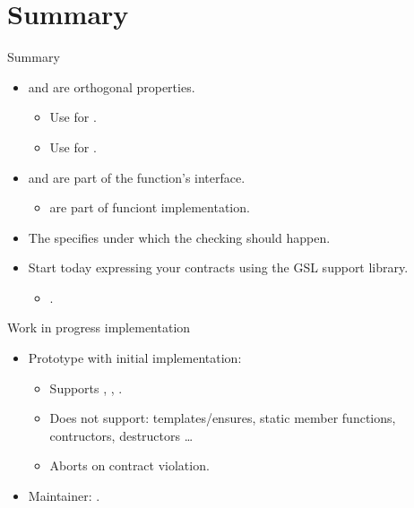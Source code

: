 \section{Summary}

\begin{frame}[t]{Summary}
\begin{itemize}
  \item {} and  are orthogonal properties.
    \begin{itemize}
      \item Use  for .
      \item Use  for .
    \end{itemize}

  \vfill\pause
  \item {} and  are part of the
        function's interface.
    \begin{itemize}
      \item {} are part of funciont implementation.
    \end{itemize}

  \vfill\pause
  \item The  specifies under which 
        the checking should happen.

  \vfill\pause
  \item Start today expressing your contracts using the GSL support library.
    \begin{itemize}
      \item {}.
    \end{itemize}
\end{itemize}
\end{frame}

\begin{frame}[t]{Work in progress implementation}
\begin{itemize}
  \item Prototype with initial implementation:
    \begin{itemize}
      \item Supports , , .
      \item Does not support: templates/ensures, static member functions, contructors, destructors \ldots
      \item Aborts on contract violation.
    \end{itemize}
  \vspace{1em}
  \item Maintainer: .
  \vspace{1em}
\end{itemize}
\end{frame}
